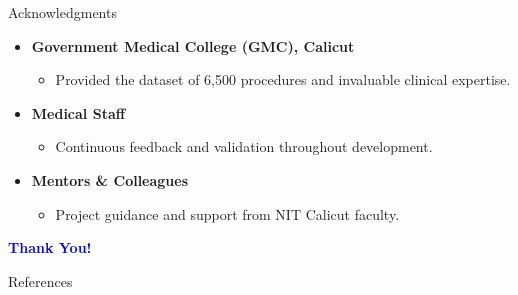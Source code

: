 ﻿\documentclass[aspectratio=169]{beamer}
\begin{document}
\begin{frame}{Acknowledgments}
\begin{itemize}
    \item \textbf{Government Medical College (GMC), Calicut}
    \begin{itemize}
        \item Provided the dataset of 6,500 procedures and invaluable clinical expertise.
    \end{itemize}
    \item \textbf{Medical Staff}
    \begin{itemize}
        \item Continuous feedback and validation throughout development.
    \end{itemize}
    \item \textbf{Mentors \& Colleagues}
    \begin{itemize}
        \item Project guidance and support from NIT Calicut faculty.
    \end{itemize}
\end{itemize}
\vspace{2em}
\centering
\textcolor{blue}{\Large \textbf{Thank You!}}
\end{frame}

\begin{frame}[allowframebreaks]{References}


\end{frame}
\end{document}
